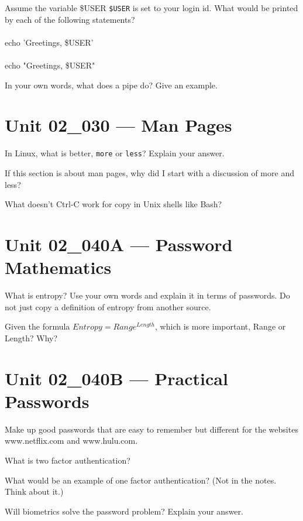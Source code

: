 \documentclass[letterpaper,12pt]{exam}
\newcommand{\unit}{Unit 02}
\begin{document}
\begin {questions}
\begin{samepage}
\begin{checkboxes}
\end{checkboxes}
\end{samepage}

\begin{samepage}
	\question Assume the variable \$USER \texttt{\$USER} is set to your login id.  What would be printed by each of the following statements? 
\\\\
	echo 'Greetings, \$USER'
	\\\\
	echo "Greetings, \$USER"

\end{samepage}

\question In your own words, what does a pipe do?  Give an example. 

\section*{\unit\_030 --- Man Pages} %
 
\question In Linux, what is better, \texttt{more} or \texttt{less}?  Explain your answer. 
\vspace{1.25cm}

\question If this section is about man pages, why did I start with a discussion of more and less? 
\vspace{1.25cm}

\question What doesn't Ctrl-C work for copy in Unix shells like Bash? 

\section*{\unit\_040A --- Password Mathematics} %

\question What is entropy?  Use your own words and explain it in terms of passwords.  Do not just copy a definition of entropy from another source. 
\vspace{1.25cm}

\question Given the formula \(Entropy = Range^{Length} \), which is more important, Range or Length?  Why?

\section*{\unit\_040B --- Practical Passwords} %

\question Make up good passwords that are easy to remember but different for the websites www.netflix.com and www.hulu.com. 
\vspace{1.25cm}

\question What is two factor authentication?
\vspace{1.25cm}

\question What would be an example of one factor authentication?  (Not in the notes.  Think about it.) 
\vspace{1.25cm}

\question Will biometrics solve the password problem?  Explain your answer. 
\vspace{2.25cm}
\end{questions}
\end{document}
